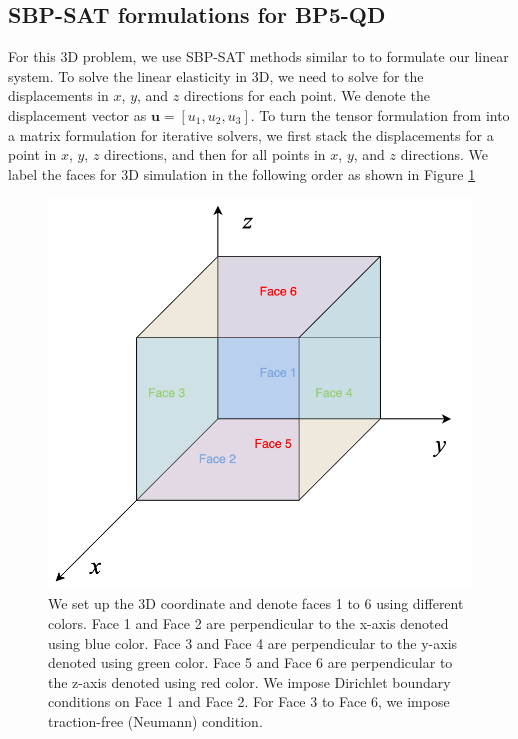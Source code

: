 \subsection{SBP-SAT formulations for BP5-QD}
For this 3D problem, we use SBP-SAT methods similar to \cite{ALMQUIST2021109842} to formulate our linear system.
To solve the linear elasticity in 3D, we need to solve for the displacements in $x$, $y$, and $z$ directions for each point.
We denote the displacement vector as $\boldsymbol{u} = [u_1, u_2, u_3]$.
To turn the tensor formulation from \cite{ALMQUIST2021109842} into a matrix formulation for iterative solvers,  we first stack the displacements for a point in $x$, $y$, $z$ directions, and then for all points in $x$, $y$, and $z$ directions.
We label the faces for 3D simulation in the following order as shown in Figure \ref{fig:3d_problem}

\begin{figure}
    \centering
    \includegraphics[width=\linewidth]{figures/3D_problem.png}
    \caption{We set up the 3D coordinate and denote faces 1 to 6 using different colors. Face 1 and Face 2 are perpendicular to the x-axis denoted using blue color. Face 3 and Face 4 are perpendicular to the y-axis denoted using green color. Face 5 and Face 6 are perpendicular to the z-axis denoted using red color. We impose Dirichlet boundary conditions on Face 1 and Face 2. For Face 3 to Face 6, we impose traction-free (Neumann) condition.} 
    \label{fig:3d_problem}
\end{figure}

